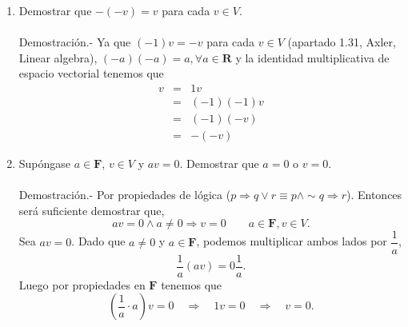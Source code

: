 \setcounter{mysection}{1}

\begin{enumerate}[\bfseries 1.]

    \item Demostrar que $-(-v)=v$ para cada $v\in V$.\\\\
	Demostración.-\; Ya que $(-1)v=-v$ para cada $v\in V$ (apartado 1.31, Axler, Linear algebra), $(-a)(-a)=a, \forall a \in \textbf{R}$ y la identidad multiplicativa de espacio vectorial tenemos que 
	$$\begin{array}{rcl}
	v &=& 1v \\
	&=& (-1)(-1)v \\
	&=& (-1)(-v) \\
	&=& -(-v)
	\end{array}$$
	\vspace{0.5cm}

    \item Supóngase $a\in \textbf{F}$, $v\in V$ y $av=0$. Demostrar que $a=0$ o $v=0$.\\\\
	Demostración.-\; Por propiedades de lógica ($p \Rightarrow q \lor r \equiv p\land \sim q \Rightarrow r$). Entonces será suficiente demostrar que,
	$$av=0 \land a\neq 0 \Rightarrow v=0 \qquad a\in \textbf{F}, v\in V.$$
	Sea $av=0$. Dado que $a\neq 0$ y $a\in \textbf{F}$, podemos multiplicar ambos lados por $\dfrac{1}{a}$,
	$$\dfrac{1}{a}(av) = 0\dfrac{1}{a}.$$
	Luego por propiedades en $\textbf{F}$ tenemos que
	$$\left(\dfrac{1}{a}\cdot a\right)v=0\quad \Rightarrow \quad 1v=0 \quad \Rightarrow \quad v=0.$$\\


\end{enumerate}
